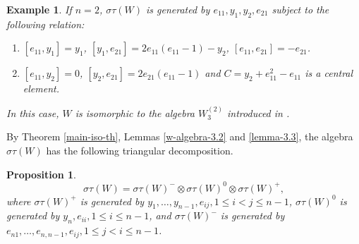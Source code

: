 \documentclass[12pt,a4paper]{amsart}
\newtheorem{example}[theorem]{Example}%
\newtheorem{proposition}[theorem]{Proposition}%
\numberwithin{equation}{section}
\begin{document}
%
%
%
%
%
%
%
%
%
%
%
%

\begin{example}If $n=2$, $\sigma\tau(W)$ is generated by
$e_{11},y_1,y_2,e_{21}$ subject to the following relation:
\begin{enumerate}
\item  $[e_{11},y_1]=y_1$, $[y_1,e_{21}]=2e_{11}(e_{11}-1)-y_2
$, $[e_{11},e_{21}]=-e_{21}$.
\item $[e_{11},y_2]=0$, $[y_2,e_{21}]
=2e_{21}(e_{11}-1)$
and $C=y_2+e_{11}^2-e_{11}$ is a central element.
\end{enumerate}
In this case, $W$ is isomorphic to the algebra $W_3^{(2)}$ introduced in
\cite{Tj}.
\end{example}

By Theorem \ref{main-iso-th},  Lemmas \ref{w-algebra-3.2} and \ref{lemma-3.3}, the algebra $\sigma\tau(W)$ has the following  triangular decomposition.

\begin{proposition}
$$\sigma\tau(W)=\sigma\tau(W)^-\otimes \sigma\tau(W)^0\otimes \sigma\tau(W)^+,$$where $\sigma\tau(W)^+$ is generated by $y_1,\dots,y_{n-1}, e_{ij}, 1\leq i<j \leq n-1$, $\sigma\tau(W)^0$ is generated by $y_n, e_{ii}, 1\leq i\leq n-1$,
and $\sigma\tau(W)^-$ is generated by $e_{n1},\dots,e_{n,n-1}, e_{ij}, 1\leq j<i \leq n-1$.
\end{proposition}
\end{document}

